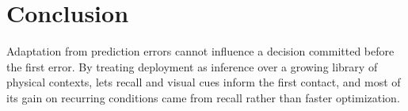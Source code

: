 \section{Conclusion}\label{sec:conclusion}

Adaptation from prediction errors cannot influence a decision committed before the first error. By treating deployment as inference over a growing library of physical contexts, \method lets recall and visual cues inform the first contact, and most of its gain on recurring conditions came from recall rather than faster optimization.

